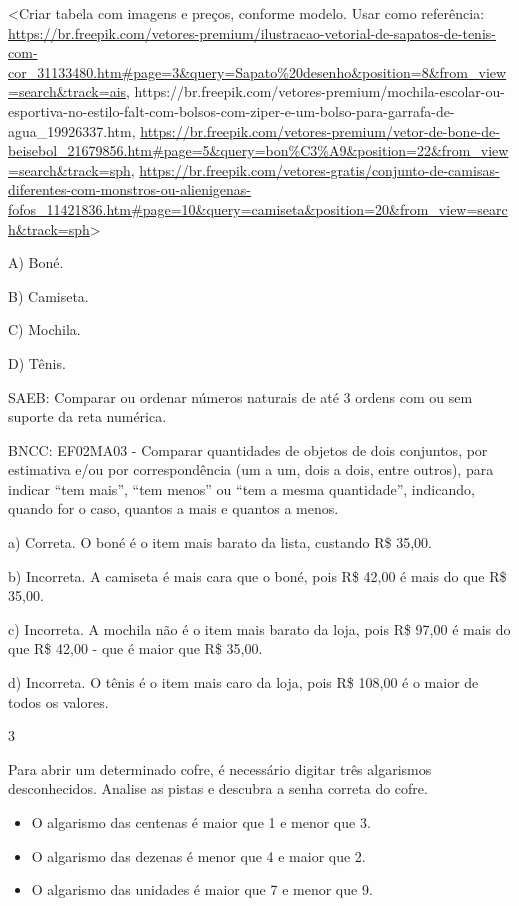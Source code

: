 \begin{escolha}
\begin{escolha}
{{{{\textless{}Criar tabela com imagens e preços, conforme modelo. Usar como
referência:
\url{https://br.freepik.com/vetores-premium/ilustracao-vetorial-de-sapatos-de-tenis-com-cor_31133480.htm\#page=3\&query=Sapato\%20desenho\&position=8\&from_view=search\&track=ais},
https://br.freepik.com/vetores-premium/mochila-escolar-ou-esportiva-no-estilo-falt-com-bolsos-com-ziper-e-um-bolso-para-garrafa-de-agua\_19926337.htm,
\url{https://br.freepik.com/vetores-premium/vetor-de-bone-de-beisebol_21679856.htm\#page=5\&query=bon\%C3\%A9\&position=22\&from_view=search\&track=sph},
\url{https://br.freepik.com/vetores-gratis/conjunto-de-camisas-diferentes-com-monstros-ou-alienigenas-fofos_11421836.htm\#page=10\&query=camiseta\&position=20\&from_view=search\&track=sph}\textgreater{}

A) Boné.

B) Camiseta.

C) Mochila.

D) Tênis.

SAEB: Comparar ou ordenar números naturais de até 3 ordens com
ou sem suporte da reta numérica.

BNCC: EF02MA03 - Comparar quantidades de objetos de dois conjuntos, por
estimativa e/ou por correspondência (um a um, dois a dois, entre
outros), para indicar ``tem mais'', ``tem menos'' ou ``tem a mesma
quantidade'', indicando, quando for o caso, quantos a mais e quantos a
menos.

a) Correta. O boné é o item mais barato da lista, custando R\$ 35,00.

b) Incorreta. A camiseta é mais cara que o boné, pois R\$ 42,00
é mais do que R\$ 35,00.

c) Incorreta. A mochila não é o item mais barato da loja, pois R\$ 97,00
é mais do que R\$ 42,00 - que é maior que R\$ 35,00.

d) Incorreta. O tênis é o item mais caro da loja, pois R\$ 108,00 é o maior de todos os valores.

\num{3}

Para abrir um determinado cofre, é necessário digitar três algarismos
desconhecidos. Analise as pistas e descubra a senha correta do cofre.

\begin{itemize}
\item
  O algarismo das centenas é maior que 1 e menor que 3.
\item
  O algarismo das dezenas é menor que 4 e maior que 2.
\item
  O algarismo das unidades é maior que 7 e menor que 9.
\end{itemize}

}}}}
\end{escolha}
\end{escolha}
